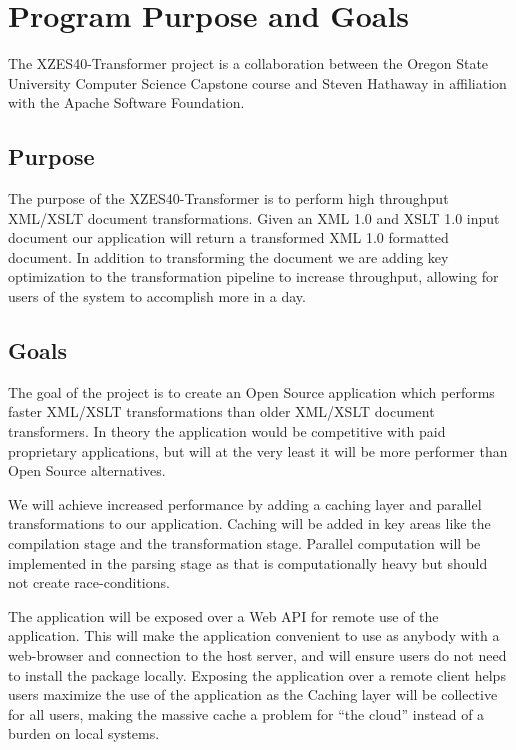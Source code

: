 \section{Program Purpose and Goals}

The XZES40-Transformer project is a collaboration between the Oregon State University Computer Science Capstone course and Steven Hathaway in affiliation with the Apache Software Foundation.

\subsection{Purpose}

The purpose of the XZES40-Transformer is to perform high throughput XML/XSLT document transformations. 
Given an XML 1.0 and XSLT 1.0 input document our application will return a transformed XML 1.0 formatted document.
In addition to transforming the document we are adding key optimization to the transformation pipeline to increase throughput, allowing for users of the system to accomplish more in a day.

\subsection{Goals}

The goal of the project is to create an Open Source application which performs faster XML/XSLT transformations than older XML/XSLT document transformers.
In theory the application would be competitive with paid proprietary applications, but will at the very least it will be more performer than Open Source alternatives.

We will achieve increased performance by adding a caching layer and parallel transformations to our application.
Caching will be added in key areas like the compilation stage and the transformation stage.
Parallel computation will be implemented in the parsing stage as that is computationally heavy but should not create race-conditions.

The application will be exposed over a Web API for remote use of the application.
This will make the application convenient to use as anybody with a web-browser and connection to the host server, and will ensure users do not need to install the package locally.
Exposing the application over a remote client helps users maximize the use of the application as the Caching layer will be collective for all users, making the massive cache a problem for ``the cloud'' instead of a burden on local systems.

